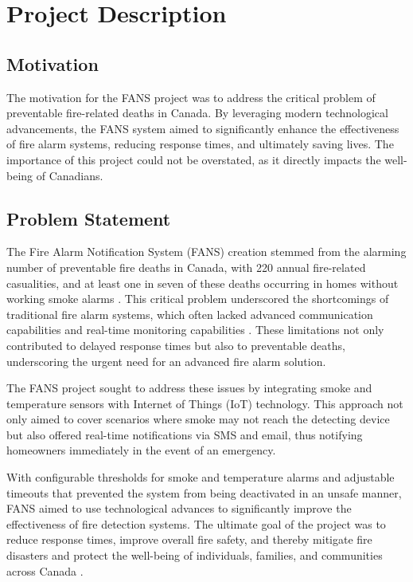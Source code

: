 \section{Project Description}

\subsection{Motivation}

The motivation for the FANS project was to address the critical problem of preventable fire-related deaths in Canada.
By leveraging modern technological advancements, the FANS system aimed to significantly enhance the effectiveness of 
fire alarm systems, reducing response times, and ultimately saving lives. The importance of this project could not be 
overstated, as it directly impacts the well-being of Canadians.

\subsection{Problem Statement}

The Fire Alarm Notification System (FANS) creation stemmed from the alarming number of preventable fire deaths in
Canada, with 220 annual fire-related casualities, and at least one in seven of these deaths occurring in homes without
working smoke alarms \cite{fire-stats}. This critical problem underscored the shortcomings of traditional fire alarm
systems, which often lacked advanced communication capabilities and real-time monitoring capabilities
\cite{modern-fire-alarms}. These limitations not only contributed to delayed response times but also to preventable
deaths, underscoring the urgent need for an advanced fire alarm solution.

The FANS project sought to address these issues by integrating smoke and temperature sensors with Internet of Things (IoT)
technology. This approach not only aimed to cover scenarios where smoke may not reach the detecting device but also
offered real-time notifications via SMS and email, thus notifying homeowners immediately in the event of an emergency.

With configurable thresholds for smoke and temperature alarms and adjustable timeouts that prevented the system
from being deactivated in an unsafe manner, FANS aimed to use technological advances to significantly improve the
effectiveness of fire detection systems. The ultimate goal of the project was to reduce response times, improve overall
fire safety, and thereby mitigate fire disasters and protect the well-being of individuals, families, and communities
across Canada \cite{smoke-alarm-gc}.

